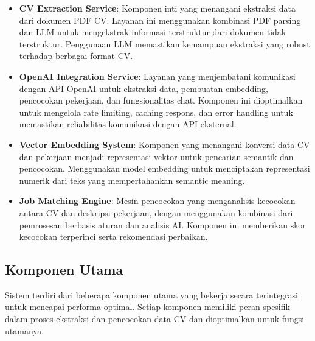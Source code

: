 \begin{itemize}
    \item \textbf{CV Extraction Service}: Komponen inti yang menangani ekstraksi data dari dokumen PDF CV. Layanan ini menggunakan kombinasi PDF parsing dan LLM untuk mengekstrak informasi terstruktur dari dokumen tidak terstruktur. Penggunaan LLM memastikan kemampuan ekstraksi yang robust terhadap berbagai format CV.
    
    \item \textbf{OpenAI Integration Service}: Layanan yang menjembatani komunikasi dengan API OpenAI untuk ekstraksi data, pembuatan embedding, pencocokan pekerjaan, dan fungsionalitas chat. Komponen ini dioptimalkan untuk mengelola rate limiting, caching respons, dan error handling untuk memastikan reliabilitas komunikasi dengan API eksternal.
    
    \item \textbf{Vector Embedding System}: Komponen yang menangani konversi data CV dan pekerjaan menjadi representasi vektor untuk pencarian semantik dan pencocokan. Menggunakan model embedding untuk menciptakan representasi numerik dari teks yang mempertahankan semantic meaning.
    
    \item \textbf{Job Matching Engine}: Mesin pencocokan yang menganalisis kecocokan antara CV dan deskripsi pekerjaan, dengan menggunakan kombinasi dari pemrosesan berbasis aturan dan analisis AI. Komponen ini memberikan skor kecocokan terperinci serta rekomendasi perbaikan.
\end{itemize}

\subsection{Komponen Utama}
Sistem terdiri dari beberapa komponen utama yang bekerja secara terintegrasi untuk mencapai performa optimal. Setiap komponen memiliki peran spesifik dalam proses ekstraksi dan pencocokan data CV dan dioptimalkan untuk fungsi utamanya.


